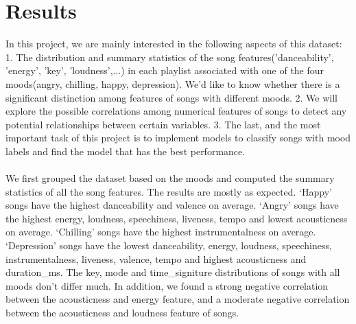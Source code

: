 \documentclass{article}
\begin{document}





\section{Results}
In this project, we are mainly interested in the following aspects of this dataset: 1. The distribution and summary statistics of the song features('danceability', 'energy', 'key', 'loudness',...) in each playlist associated with one of the four moods(angry, chilling, happy, depression). We’d like to know whether there is a significant distinction among features of songs with different moods. 2. We will explore the possible correlations among numerical features of songs to detect any potential relationships between certain variables. 3. The last, and the most important task of this project is to implement models to classify songs with mood labels and find the model that has the best performance. \\
\\
We first grouped the dataset based on the moods and computed the summary statistics of all the song features. The results are mostly as expected. ‘Happy’ songs have the highest danceability and valence on average. ‘Angry’ songs have the highest energy, loudness, speechiness, liveness, tempo and lowest acousticness on average. ‘Chilling’ songs have the highest instrumentalness on average. ‘Depression’ songs have the lowest danceability, energy, loudness, speechiness, instrumentalness, liveness, valence, tempo and highest acousticness and duration\_ms. The key, mode and time\_signiture distributions of songs with all moods don’t differ much. In addition, we found a strong negative correlation between the acousticness and energy feature, and a moderate negative correlation between the acousticness and loudness feature of songs. \\
\end{document}
